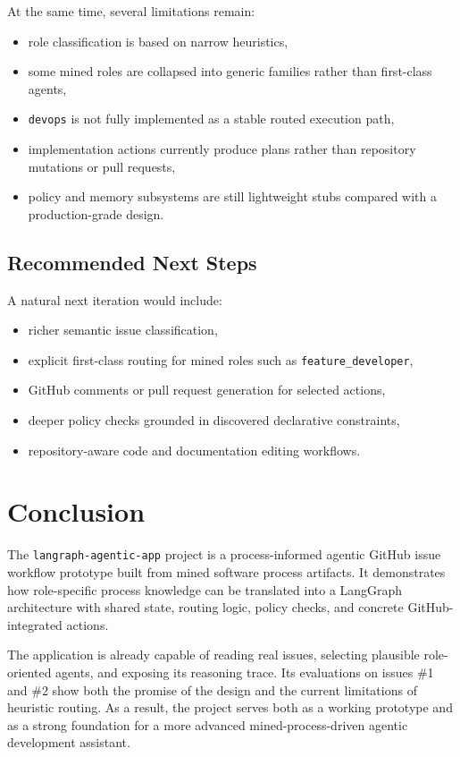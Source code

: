 \documentclass[11pt,a4paper]{article}
\begin{document}
At the same time, several limitations remain:
\begin{itemize}
    \item role classification is based on narrow heuristics,
    \item some mined roles are collapsed into generic families rather than first-class agents,
    \item \texttt{devops} is not fully implemented as a stable routed execution path,
    \item implementation actions currently produce plans rather than repository mutations or pull requests,
    \item policy and memory subsystems are still lightweight stubs compared with a production-grade design.
\end{itemize}

\subsection{Recommended Next Steps}

A natural next iteration would include:
\begin{itemize}
    \item richer semantic issue classification,
    \item explicit first-class routing for mined roles such as \texttt{feature\_developer},
    \item GitHub comments or pull request generation for selected actions,
    \item deeper policy checks grounded in discovered declarative constraints,
    \item repository-aware code and documentation editing workflows.
\end{itemize}

\section{Conclusion}

The \texttt{langraph-agentic-app} project is a process-informed agentic GitHub issue workflow prototype built from mined software process artifacts. It demonstrates how role-specific process knowledge can be translated into a LangGraph architecture with shared state, routing logic, policy checks, and concrete GitHub-integrated actions.

The application is already capable of reading real issues, selecting plausible role-oriented agents, and exposing its reasoning trace. Its evaluations on issues \#1 and \#2 show both the promise of the design and the current limitations of heuristic routing. As a result, the project serves both as a working prototype and as a strong foundation for a more advanced mined-process-driven agentic development assistant.
\end{document}
